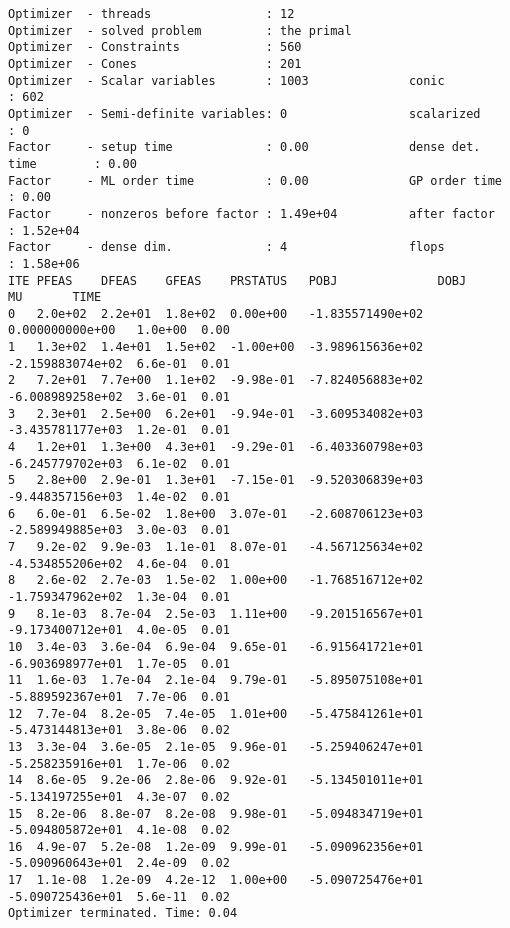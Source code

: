 \documentclass[
  10pt,
  a4paper,
,tablecaptionabove
]{scrartcl}
\begin{document}
\begin{verbatim}
Optimizer  - threads                : 12              
Optimizer  - solved problem         : the primal      
Optimizer  - Constraints            : 560
Optimizer  - Cones                  : 201
Optimizer  - Scalar variables       : 1003              conic                  : 602             
Optimizer  - Semi-definite variables: 0                 scalarized             : 0               
Factor     - setup time             : 0.00              dense det. time        : 0.00            
Factor     - ML order time          : 0.00              GP order time          : 0.00            
Factor     - nonzeros before factor : 1.49e+04          after factor           : 1.52e+04        
Factor     - dense dim.             : 4                 flops                  : 1.58e+06        
ITE PFEAS    DFEAS    GFEAS    PRSTATUS   POBJ              DOBJ              MU       TIME  
0   2.0e+02  2.2e+01  1.8e+02  0.00e+00   -1.835571490e+02  0.000000000e+00   1.0e+00  0.00  
1   1.3e+02  1.4e+01  1.5e+02  -1.00e+00  -3.989615636e+02  -2.159883074e+02  6.6e-01  0.01  
2   7.2e+01  7.7e+00  1.1e+02  -9.98e-01  -7.824056883e+02  -6.008989258e+02  3.6e-01  0.01  
3   2.3e+01  2.5e+00  6.2e+01  -9.94e-01  -3.609534082e+03  -3.435781177e+03  1.2e-01  0.01  
4   1.2e+01  1.3e+00  4.3e+01  -9.29e-01  -6.403360798e+03  -6.245779702e+03  6.1e-02  0.01  
5   2.8e+00  2.9e-01  1.3e+01  -7.15e-01  -9.520306839e+03  -9.448357156e+03  1.4e-02  0.01  
6   6.0e-01  6.5e-02  1.8e+00  3.07e-01   -2.608706123e+03  -2.589949885e+03  3.0e-03  0.01  
7   9.2e-02  9.9e-03  1.1e-01  8.07e-01   -4.567125634e+02  -4.534855206e+02  4.6e-04  0.01  
8   2.6e-02  2.7e-03  1.5e-02  1.00e+00   -1.768516712e+02  -1.759347962e+02  1.3e-04  0.01  
9   8.1e-03  8.7e-04  2.5e-03  1.11e+00   -9.201516567e+01  -9.173400712e+01  4.0e-05  0.01  
10  3.4e-03  3.6e-04  6.9e-04  9.65e-01   -6.915641721e+01  -6.903698977e+01  1.7e-05  0.01  
11  1.6e-03  1.7e-04  2.1e-04  9.79e-01   -5.895075108e+01  -5.889592367e+01  7.7e-06  0.01  
12  7.7e-04  8.2e-05  7.4e-05  1.01e+00   -5.475841261e+01  -5.473144813e+01  3.8e-06  0.02  
13  3.3e-04  3.6e-05  2.1e-05  9.96e-01   -5.259406247e+01  -5.258235916e+01  1.7e-06  0.02  
14  8.6e-05  9.2e-06  2.8e-06  9.92e-01   -5.134501011e+01  -5.134197255e+01  4.3e-07  0.02  
15  8.2e-06  8.8e-07  8.2e-08  9.98e-01   -5.094834719e+01  -5.094805872e+01  4.1e-08  0.02  
16  4.9e-07  5.2e-08  1.2e-09  9.99e-01   -5.090962356e+01  -5.090960643e+01  2.4e-09  0.02  
17  1.1e-08  1.2e-09  4.2e-12  1.00e+00   -5.090725476e+01  -5.090725436e+01  5.6e-11  0.02  
Optimizer terminated. Time: 0.04    
\end{verbatim}
\end{document}
